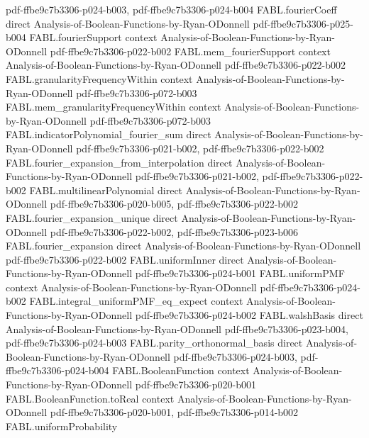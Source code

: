 \begin{theorem}
  {pdf-ffbe9c7b3306-p024-b003,
    pdf-ffbe9c7b3306-p024-b004}
\proofstep
  {FABL.fourierCoeff}
  {direct}
  {Analysis-of-Boolean-Functions-by-Ryan-ODonnell}
  {pdf-ffbe9c7b3306-p025-b004}
\proofstep
  {FABL.fourierSupport}
  {context}
  {Analysis-of-Boolean-Functions-by-Ryan-ODonnell}
  {pdf-ffbe9c7b3306-p022-b002}
\proofstep
  {FABL.mem_fourierSupport}
  {context}
  {Analysis-of-Boolean-Functions-by-Ryan-ODonnell}
  {pdf-ffbe9c7b3306-p022-b002}
\proofstep
  {FABL.granularityFrequencyWithin}
  {context}
  {Analysis-of-Boolean-Functions-by-Ryan-ODonnell}
  {pdf-ffbe9c7b3306-p072-b003}
\proofstep
  {FABL.mem_granularityFrequencyWithin}
  {context}
  {Analysis-of-Boolean-Functions-by-Ryan-ODonnell}
  {pdf-ffbe9c7b3306-p072-b003}
\proofstep
  {FABL.indicatorPolynomial_fourier_sum}
  {direct}
  {Analysis-of-Boolean-Functions-by-Ryan-ODonnell}
  {pdf-ffbe9c7b3306-p021-b002,
    pdf-ffbe9c7b3306-p022-b002}
\proofstep
  {FABL.fourier_expansion_from_interpolation}
  {direct}
  {Analysis-of-Boolean-Functions-by-Ryan-ODonnell}
  {pdf-ffbe9c7b3306-p021-b002,
    pdf-ffbe9c7b3306-p022-b002}
\proofstep
  {FABL.multilinearPolynomial}
  {direct}
  {Analysis-of-Boolean-Functions-by-Ryan-ODonnell}
  {pdf-ffbe9c7b3306-p020-b005,
    pdf-ffbe9c7b3306-p022-b002}
\proofstep
  {FABL.fourier_expansion_unique}
  {direct}
  {Analysis-of-Boolean-Functions-by-Ryan-ODonnell}
  {pdf-ffbe9c7b3306-p022-b002,
    pdf-ffbe9c7b3306-p023-b006}
\proofstep
  {FABL.fourier_expansion}
  {direct}
  {Analysis-of-Boolean-Functions-by-Ryan-ODonnell}
  {pdf-ffbe9c7b3306-p022-b002}
\proofstep
  {FABL.uniformInner}
  {direct}
  {Analysis-of-Boolean-Functions-by-Ryan-ODonnell}
  {pdf-ffbe9c7b3306-p024-b001}
\proofstep
  {FABL.uniformPMF}
  {context}
  {Analysis-of-Boolean-Functions-by-Ryan-ODonnell}
  {pdf-ffbe9c7b3306-p024-b002}
\proofstep
  {FABL.integral_uniformPMF_eq_expect}
  {context}
  {Analysis-of-Boolean-Functions-by-Ryan-ODonnell}
  {pdf-ffbe9c7b3306-p024-b002}
\proofstep
  {FABL.walshBasis}
  {direct}
  {Analysis-of-Boolean-Functions-by-Ryan-ODonnell}
  {pdf-ffbe9c7b3306-p023-b004,
    pdf-ffbe9c7b3306-p024-b003}
\proofstep
  {FABL.parity_orthonormal_basis}
  {direct}
  {Analysis-of-Boolean-Functions-by-Ryan-ODonnell}
  {pdf-ffbe9c7b3306-p024-b003,
    pdf-ffbe9c7b3306-p024-b004}
\proofstep
  {FABL.BooleanFunction}
  {context}
  {Analysis-of-Boolean-Functions-by-Ryan-ODonnell}
  {pdf-ffbe9c7b3306-p020-b001}
\proofstep
  {FABL.BooleanFunction.toReal}
  {context}
  {Analysis-of-Boolean-Functions-by-Ryan-ODonnell}
  {pdf-ffbe9c7b3306-p020-b001,
    pdf-ffbe9c7b3306-p014-b002}
\proofstep
  {FABL.uniformProbability}

\end{theorem}

